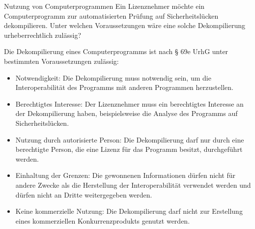\documentclass{article}
\begin{document}
\begin{exercise}{Nutzung von Computerprogrammen}
  Ein Lizenznehmer möchte ein Computerprogramm zur automatisierten Prüfung auf Sicherheitslücken dekompilieren. Unter welchen Voraussetzungen wäre eine solche Dekompilierung urheberrechtlich zulässig?

  \begin{solution}
    Die Dekompilierung eines Computerprogramms ist nach § 69e UrhG unter bestimmten Voraussetzungen zulässig:
    \begin{itemize}
      \item Notwendigkeit: Die Dekompilierung muss notwendig sein, um die Interoperabilität des Programms mit anderen Programmen herzustellen.
      \item Berechtigtes Interesse: Der Lizenznehmer muss ein berechtigtes Interesse an der Dekompilierung haben, beispielsweise die Analyse des Programms auf Sicherheitslücken.
      \item Nutzung durch autorisierte Person: Die Dekompilierung darf nur durch eine berechtigte Person, die eine Lizenz für das Programm besitzt, durchgeführt werden.
      \item Einhaltung der Grenzen: Die gewonnenen Informationen dürfen nicht für andere Zwecke als die Herstellung der Interoperabilität verwendet werden und dürfen nicht an Dritte weitergegeben werden.
      \item Keine kommerzielle Nutzung: Die Dekompilierung darf nicht zur Erstellung eines kommerziellen Konkurrenzprodukts genutzt werden.
    \end{itemize}
  \end{solution}
\end{exercise}
\end{document}

